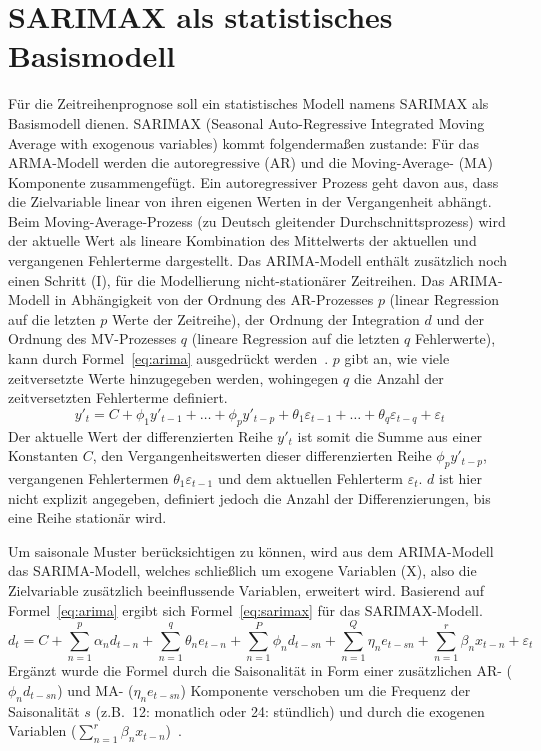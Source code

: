 \section{SARIMAX als statistisches Basismodell}
Für die Zeitreihenprognose soll ein statistisches Modell namens SARIMAX als Basismodell dienen.
SARIMAX (Seasonal Auto-Regressive Integrated Moving Average with exogenous variables) kommt folgendermaßen zustande:
Für das ARMA-Modell werden die autoregressive (AR) und die Moving-Average- (MA) Komponente zusammengefügt.
Ein autoregressiver Prozess geht davon aus, dass die Zielvariable linear von ihren eigenen Werten in der Vergangenheit abhängt.
Beim Moving-Average-Prozess (zu Deutsch gleitender Durchschnittsprozess) wird der aktuelle Wert als lineare Kombination des Mittelwerts der aktuellen und vergangenen Fehlerterme dargestellt.
Das \ac{ARIMA}-Modell enthält zusätzlich noch einen Schritt (I), für die Modellierung nicht-stationärer Zeitreihen.
Das ARIMA-Modell in Abhängigkeit von der Ordnung des AR-Prozesses $p$ (linear Regression auf die letzten $p$ Werte der Zeitreihe), der Ordnung der Integration $d$ und der Ordnung des MV-Prozesses $q$ (lineare Regression auf die letzten $q$ Fehlerwerte), kann durch Formel~\ref{eq:arima} ausgedrückt werden~\cite{Peixeiro.2022}.
$p$ gibt an, wie viele zeitversetzte Werte hinzugegeben werden, wohingegen $q$ die Anzahl der zeitversetzten Fehlerterme definiert.
\begin{equation}
 \label{eq:arima}
 y'_t = C + \phi_1 y'_{t-1} + \ldots + \phi_p y'_{t-p} + \theta_1 \varepsilon_{t-1} + \ldots + \theta_q \varepsilon_{t-q} + \varepsilon_t
\end{equation}
Der aktuelle Wert der differenzierten Reihe $y'_t$ ist somit die Summe aus einer Konstanten $C$, den Vergangenheitswerten dieser differenzierten Reihe $\phi_p y'_{t-p}$, vergangenen Fehlertermen $\theta_1 \varepsilon_{t-1}$ und dem aktuellen Fehlerterm $\varepsilon_t$.
$d$ ist hier nicht explizit angegeben, definiert jedoch die Anzahl der Differenzierungen, bis eine Reihe stationär wird.

Um saisonale Muster berücksichtigen zu können, wird aus dem \ac{ARIMA}-Modell das SARIMA-Modell, welches schließlich um exogene Variablen (X), also die Zielvariable zusätzlich beeinflussende Variablen, erweitert wird.
Basierend auf Formel~\ref{eq:arima} ergibt sich Formel~\ref{eq:sarimax} für das SARIMAX-Modell.
\begin{equation}
 \label{eq:sarimax}
 d_t = C + \sum_{n=1}^{p} \alpha_n d_{t-n} + \sum_{n=1}^{q} \theta_n e_{t-n} + \sum_{n=1}^{P} \phi_n d_{t-sn} + \sum_{n=1}^{Q} \eta_n e_{t-sn} + \sum_{n=1}^{r} \beta_n x_{t-n} + \varepsilon_t
\end{equation}
Ergänzt wurde die Formel durch die Saisonalität in Form einer zusätzlichen AR- ($\phi_n d_{t-sn}$) und MA- ($\eta_n e_{t-sn}$) Komponente verschoben um die Frequenz der Saisonalität $s$ (z.B.\ 12: monatlich oder 24: stündlich) und durch die exogenen Variablen ($\sum_{n=1}^{r} \beta_n x_{t-n}$)~\cite{Artley.26.4.2022}.

